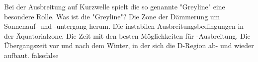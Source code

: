     {Bei der Ausbreitung auf Kurzwelle spielt die so genannte "Greyline" eine besondere Rolle. Was ist die "Greyline"?}
    {Die Zone der Dämmerung um Sonnenauf- und -untergang herum.}
    {Die instabilen Ausbreitungsbedingungen in der Äquatorialzone.}
    {Die Zeit mit den besten Möglichkeiten für -Ausbreitung.}
    {Die Übergangszeit vor und nach dem Winter, in der sich die D-Region ab- und wieder aufbaut.}
    {false}{false}